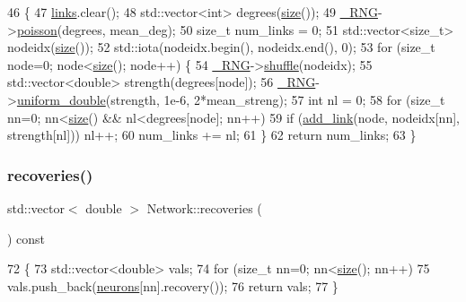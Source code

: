 \begin{DoxyCode}
46                                                                                 \{
47     \hyperlink{classNetwork_aef1609a9a6b865651417ce995b4575a8}{links}.clear();
48     std::vector<int> degrees(\hyperlink{classNetwork_a41c54d12d861883170b5c5abca3a7bc8}{size}());
49     \hyperlink{main_8cpp_ad20d7a8b3940b60cfd9cd7188fb503ea}{\_RNG}->\hyperlink{classRandomNumbers_a1195251686ad00cd782c9a91a44d983b}{poisson}(degrees, mean\_deg);
50     \textcolor{keywordtype}{size\_t} num\_links = 0;
51     std::vector<size\_t> nodeidx(\hyperlink{classNetwork_a41c54d12d861883170b5c5abca3a7bc8}{size}());
52     std::iota(nodeidx.begin(), nodeidx.end(), 0);
53     \textcolor{keywordflow}{for} (\textcolor{keywordtype}{size\_t} node=0; node<\hyperlink{classNetwork_a41c54d12d861883170b5c5abca3a7bc8}{size}(); node++) \{
54         \hyperlink{main_8cpp_ad20d7a8b3940b60cfd9cd7188fb503ea}{\_RNG}->\hyperlink{classRandomNumbers_a851aaa7e46922dc22ce984b21b474a4e}{shuffle}(nodeidx);
55         std::vector<double> strength(degrees[node]);
56         \hyperlink{main_8cpp_ad20d7a8b3940b60cfd9cd7188fb503ea}{\_RNG}->\hyperlink{classRandomNumbers_ae226c129494f9055ac37ed1af943d010}{uniform\_double}(strength, 1e-6, 2*mean\_streng);
57         \textcolor{keywordtype}{int} nl = 0;
58         \textcolor{keywordflow}{for} (\textcolor{keywordtype}{size\_t} nn=0; nn<\hyperlink{classNetwork_a41c54d12d861883170b5c5abca3a7bc8}{size}() && nl<degrees[node]; nn++)
59             \textcolor{keywordflow}{if} (\hyperlink{classNetwork_a6ebe0899329973e4924997a25e205856}{add\_link}(node, nodeidx[nn], strength[nl])) nl++;
60         num\_links += nl;
61     \}
62     \textcolor{keywordflow}{return} num\_links;
63 \}
\end{DoxyCode}
\mbox{\label{classNetwork_a2e9dbb815c622cccdd50186ae8c9f4a7}} 
\subsubsection{\texorpdfstring{recoveries()}{recoveries()}}
{\footnotesize\ttfamily std\+::vector$<$ double $>$ Network\+::recoveries (\begin{DoxyParamCaption}{ }\end{DoxyParamCaption}) const}


\begin{DoxyCode}
72                                             \{
73     std::vector<double> vals;
74     \textcolor{keywordflow}{for} (\textcolor{keywordtype}{size\_t} nn=0; nn<\hyperlink{classNetwork_a41c54d12d861883170b5c5abca3a7bc8}{size}(); nn++)
75         vals.push\_back(\hyperlink{classNetwork_a1b7832bc2c7b8855cdc3b2d6329eff9d}{neurons}[nn].recovery());
76     \textcolor{keywordflow}{return} vals;
77 \}
\end{DoxyCode}
\mbox{\label{classNetwork_ad91ae24f308dd2b46ff76396fcdb9765}} 
